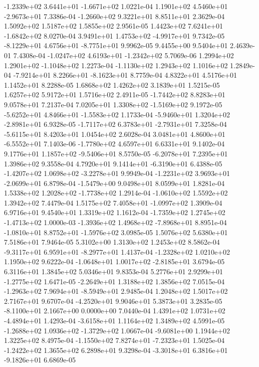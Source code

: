 -1.2339e+02  3.6441e+01 -1.6671e+02  1.0221e-04
 1.1901e+02  4.5460e+01 -2.9673e+01  7.3386e-04
-1.2660e+02  9.3221e+01  8.8511e+01  2.3629e-04
1.5092e+02 1.5187e+02 1.5855e+02  2.9561e-05
 1.4423e+02  7.6241e+01 -1.6842e+02  8.0270e-04
 3.9491e+01  1.4753e+02 -4.9917e+01  9.7342e-05
-8.1229e+01  4.6756e+01 -8.7751e+01  9.9962e-05
9.4455e+00 9.5404e+01 2.4639e-01  7.4308e-04
-1.0247e+02  4.6193e+01 -1.2342e+02  5.7069e-06
 1.2994e+02  1.2901e+02 -1.1048e+02  1.2273e-04
-1.1130e+02  1.2943e+02  1.1016e+02  1.2849e-04
-7.9214e+01  8.2266e+01 -8.1623e+01  8.7759e-04
4.8322e+01 4.5176e+01 1.1452e+01  8.2288e-05
1.6868e+02 1.4262e+02 3.1839e+01  1.5215e-05
1.6257e+02 5.9172e+01 1.5716e+02  2.4911e-05
-1.7442e+02  8.8283e+01  9.0578e+01  7.2137e-04
 7.0205e+01  1.3308e+02 -1.5169e+02  9.1972e-05
-5.6252e+01  4.8466e+01 -1.5583e+02  1.1733e-04
-5.9460e+01  1.3204e+02 -2.8981e+01  6.9328e-05
-1.7117e+02  6.3783e+01 -2.7931e+01  7.3258e-04
-5.6115e+01  8.4203e+01  1.0454e+02  2.6028e-04
 3.0481e+01  4.8600e+01 -6.5552e+01  7.1403e-06
-1.7780e+02  4.6597e+01  6.6331e+01  9.1402e-04
 9.1776e+01  1.1857e+02 -9.5406e+01  8.5750e-05
-6.2078e+01  7.2395e+01  1.3986e+02  9.3558e-04
 4.7920e+01  9.1414e+01 -6.3190e+01  6.4388e-05
-1.4207e+02  1.0698e+02 -3.2278e+01  9.9949e-04
-1.2231e+02  3.9693e+01 -2.0699e+01  6.8798e-04
-1.5479e+00  9.0498e+01  8.0599e+01  1.8281e-04
 1.5338e+02  1.2028e+02 -1.7738e+02  1.2914e-04
-1.0610e+02  1.5592e+02  1.3942e+02  7.4479e-04
 1.5175e+02  7.4058e+01 -1.0997e+02  1.3909e-04
6.9716e+01 9.4540e+01 1.3319e+02  1.1612e-04
-1.7359e+02  1.2745e+02 -1.4713e+02  1.0000e-03
-1.3936e+02  1.4968e+02 -7.8968e+01  8.8951e-04
-1.0810e+01  8.8752e+01 -1.5976e+02  3.0985e-05
1.5076e+02 5.6380e+01 7.5186e+01  7.9464e-05
5.3102e+00 1.3130e+02 1.2453e+02  8.5862e-04
-9.3117e+01  6.9591e+01 -8.2977e+01  1.4137e-04
-1.2328e+02  1.0210e+02  1.1950e+02  9.6222e-04
-1.0648e+01  1.0017e+02 -2.8185e+01  3.6794e-05
6.3116e+01 1.3845e+02 5.0346e+01  9.8353e-04
 5.2776e+01  2.9299e+01 -1.2775e+02  1.6471e-05
-2.2649e+01  1.3188e+02  1.3856e+02  7.0515e-04
-1.2963e+02  7.9694e+01 -8.5949e+01  2.9485e-04
1.2048e+02 1.5017e+02 2.7167e+01  9.6707e-04
-4.2520e+01  9.9046e+01  5.3873e+01  3.2835e-05
-8.1100e+01  2.1667e+00  0.0000e+00  7.0440e-04
 1.4391e+02  1.0731e+02 -4.4894e+01  1.4293e-04
-3.6158e+01  1.1164e+02  1.3489e+02  4.5991e-05
-1.2688e+02  1.0936e+02 -1.3729e+02  1.0667e-04
-9.6081e+00  1.1944e+02  1.3225e+02  8.4975e-04
-1.1550e+02  7.8274e+01 -7.2323e+01  1.5025e-04
-1.2422e+02  1.3655e+02  6.2898e+01  9.3298e-04
-3.3018e+01  6.3816e+01 -9.1826e+01  6.6869e-05
